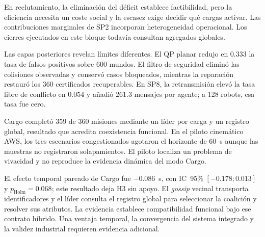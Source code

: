 En reclutamiento, la eliminación del déficit establece factibilidad, pero la eficiencia necesita un coste social y la escasez exige decidir qué cargas activar. Las contribuciones marginales de SP2 incorporan heterogeneidad operacional. Los cierres ejecutados en este bloque todavía consultan agregados globales.

Las capas posteriores revelan límites diferentes. El QP planar redujo en \(0.333\) la tasa de falsos positivos sobre 600 mundos. El filtro de seguridad eliminó las colisiones observadas y conservó casos bloqueados, mientras la reparación restauró los 360 certificados recuperables. En SP8, la retransmisión elevó la tasa libre de conflicto en \(0.054\) y añadió \(261.3\) mensajes por agente; a 128 robots, esa tasa fue cero.

Cargo completó 359 de 360 misiones mediante un líder por carga y un registro global, resultado que acredita coexistencia funcional. En el piloto cinemático AWS, los tres escenarios congestionados agotaron el horizonte de \(60\)~s aunque las muestras no registraron solapamientos. El piloto localiza un problema de vivacidad y no reproduce la evidencia dinámica del modo Cargo.


El efecto temporal pareado de Cargo fue \(-0.086\)~s, con IC~95\% \([-0.178;0.013]\) y \(p_{\mathrm{Holm}}=0.068\); este resultado deja H3 sin apoyo. El \emph{gossip} vecinal transporta identificadores y el líder consulta el registro global para seleccionar la coalición y resolver sus atributos. La evidencia establece compatibilidad funcional bajo ese contrato híbrido. Una ventaja temporal, la convergencia del sistema integrado y la validez industrial requieren evidencia adicional.

